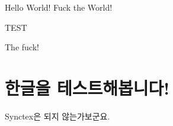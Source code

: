 \documentclass{article}
\begin{document}
Hello World! Fuck the World! 

TEST

The fuck! 

\section{한글을 테스트해봅니다!}
Synctex은 되지 않는가보군요. 
\end{document}
